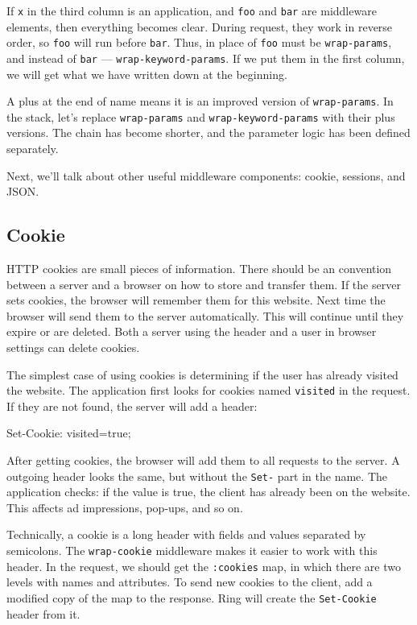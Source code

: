 \fi

If \verb|x| in the third column is an application, and \verb|foo| and \verb|bar| are middleware elements, then everything becomes clear. During request, they work in reverse order, so \verb|foo| will run before \verb|bar|. Thus, in place of \verb|foo| must be \verb|wrap-params|, and instead of \verb|bar| — \verb|wrap-keyword-params|. If we put them in the first column, we will get what we have written down at the beginning.

A plus at the end of name means it is an improved version of \verb|wrap-params|. In the stack, let's replace \verb|wrap-params| and \verb|wrap-keyword-params| with their 
plus versions. The chain has become shorter, and the parameter logic has been defined separately.

Next, we'll talk about other useful middleware components: cookie, sessions, and JSON.

\subsection{Cookie}


HTTP cookies are small pieces of information. There should be an convention between a server and a browser on how to store and transfer them. If the server sets cookies, 
the browser will remember them for this website. Next time the browser will send them to the server automatically. This will continue until they expire or are deleted. Both a server using the header and a user in browser settings can delete cookies.

The simplest case of using cookies is determining if the user has already visited the website. The application first looks for cookies named \verb|visited| in the request. If they are not found, the server will add a header:

\begin{english}
\begin{http}
Set-Cookie: visited=true;
\end{http}
\end{english}

After getting cookies, the browser will add them to all requests to the server. A outgoing header looks the same, but without the \verb|Set-| part in the name. The application checks: if the value is true, the client has already been on the website. This affects ad impressions, pop-ups, and so on.

Technically, a cookie is a long header with fields and values separated by semicolons. The \verb|wrap-cookie| middleware makes it easier to work with this header. In the request, we should get the \verb|:cookies| map, in which there are two levels with names and attributes. To send new cookies to the client, add a modified copy of the map to the response. Ring will create the \verb|Set-Cookie| header from it.


